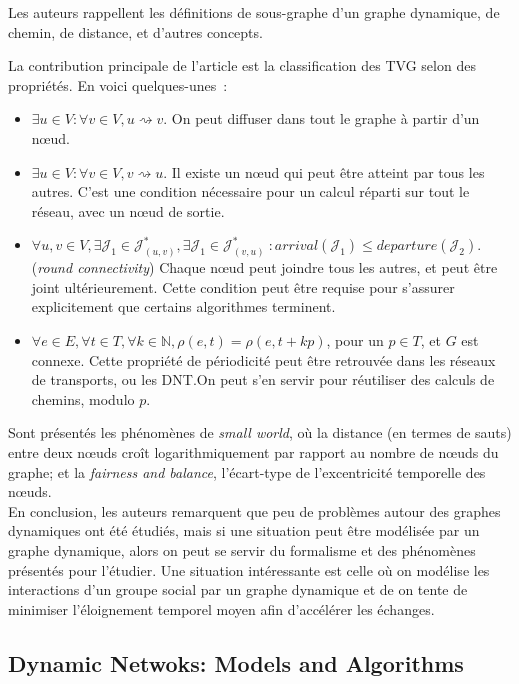 \documentclass[12pt,a4paper]{article}
\begin{document}
Les auteurs rappellent les définitions de sous-graphe d'un graphe
dynamique, de chemin, de distance, et d'autres concepts.

La contribution principale de l'article est la classification des TVG
selon des propriétés. En voici quelques-unes~:

\begin{itemize}
\item \(\exists u \in V : \forall v \in V, u \rightsquigarrow v\). On
  peut diffuser dans tout le graphe à partir d'un nœud.
\item \(\exists u \in V : \forall v \in V, v \rightsquigarrow u\). Il
  existe un nœud qui peut être atteint par tous les autres. C'est une
  condition nécessaire pour un calcul réparti sur tout le réseau, avec
  un nœud de sortie.
\item
  \(\forall u, v \in V, \exists \mathcal{J}_1 \in
  \mathcal{J}^*_{(u,v)}, \exists \mathcal{J}_1 \in
  \mathcal{J}^*_{(v,u)}~: arrival(\mathcal{J}_1) \leq
  departure(\mathcal{J}_2)\). (\textit{round connectivity}) Chaque
  nœud peut joindre tous les autres, et peut être joint
  ultérieurement. Cette condition peut être requise pour s'assurer
  explicitement que certains algorithmes terminent.
\item
  \(\forall e \in E, \forall t \in T, \forall k \in \mathbb{N},
  \rho(e, t) = \rho(e, t + kp)\), pour un \(p \in T\), et \(G\) est
  connexe. Cette propriété de périodicité peut être retrouvée dans les
  réseaux de transports, ou les DNT.\@ On peut s'en servir pour
  réutiliser des calculs de chemins, modulo \(p\).
\end{itemize}

Sont présentés les phénomènes de \textit{small world}, où la distance
(en termes de sauts) entre deux nœuds croît logarithmiquement par
rapport au nombre de nœuds du graphe; et la \textit{fairness and
  balance}, l'écart-type de l'excentricité temporelle des nœuds.\\

En conclusion, les auteurs remarquent que peu de problèmes autour des
graphes dynamiques ont été étudiés, mais si une situation peut être
modélisée par un graphe dynamique, alors on peut se servir du
formalisme et des phénomènes présentés pour l'étudier. Une situation
intéressante est celle où on modélise les interactions d'un groupe
social par un graphe dynamique et de on tente de minimiser
l'éloignement temporel moyen afin d'accélérer les échanges.

\subsection{Dynamic Netwoks: Models and
  Algorithms~\cite{kuhn2011dynamic}}
\end{document}
